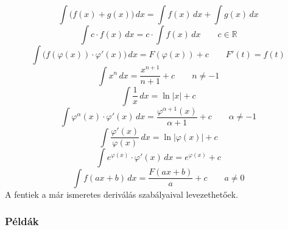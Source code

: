 \documentclass[a4paper,12pt,twoside]{book}
\theoremstyle{break}
\theoremstyle{plain}
\newcommand{\integ}[1]{\ensuremath{\int #1\, dx}}
\begin{document}
\[\integ{\Big(f(x)+g(x)\Big)} = \integ{f(x)}+\integ{g(x)}\]
\[\integ{c\cdot f(x)} = c\cdot\integ{f(x)} \qquad c\in\mathbb{R}\]
\[\integ{\Big(f(\varphi(x))\cdot \varphi'(x)\Big)} = F(\varphi(x))+c \qquad F'(t) = f(t)\]
\[\integ{x^n} = \frac{x^{n+1}}{n+1}+c \qquad n\neq -1\]
\[\integ{\frac{1}{x}} = \ln|x| + c\]
\[\integ{\varphi^\alpha(x)\cdot \varphi'(x)} = \frac{\varphi^{\alpha+1}(x)}{\alpha+1}+c \qquad \alpha \neq -1\]
\[\integ{\frac{\varphi'(x)}{\varphi(x)}} = \ln|\varphi(x)| + c\]
\[\integ{e^{\varphi(x)}\cdot\varphi'(x)} = e^{\varphi(x)} + c\]
\[\integ{f(ax+b)} = \frac{F(ax+b)}{a}+c \qquad a\neq 0\]
A fentiek a már ismeretes deriválás szabályaival levezethetőek.

\subsubsection{Példák}
\end{document}
